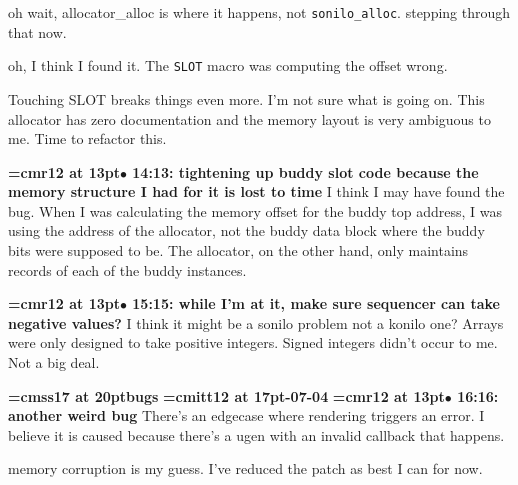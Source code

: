 oh wait, {allocator\_alloc} is where it happens, not {\tt sonilo\_alloc}. stepping through that now.
\par

oh, I think I found it. The {\tt SLOT} macro was computing the offset wrong.
\par

Touching SLOT breaks things even more. I'm not sure what is going on. This allocator has zero documentation and the memory layout is very ambiguous to me. Time to refactor this.
\par

{\smallskip\noindent\bf\font\titlefont=cmr12 at 13pt\titlefont $\bullet$ 14:13: tightening up buddy slot code because the memory structure I had for it is lost to time}\smallskip
I think I may have found the bug. When I was calculating the memory offset for the buddy top address, I was using the address of the allocator, not the buddy data block where the buddy bits were supposed to be. The allocator, on the other hand, only maintains records of each of the buddy instances.
\par

{\smallskip\noindent\bf\font\titlefont=cmr12 at 13pt\titlefont $\bullet$ 15:15: while I'm at it, make sure sequencer can take negative values?}\smallskip
I think it might be a sonilo problem not a konilo one? Arrays were only designed to take positive integers. Signed integers didn't occur to me. Not a big deal.
\par

{\medskip\noindent\bf\font\titlefont=cmss17 at 20pt\titlefont bugs}\medskip
{\medskip\noindent\bf\font\titlefont=cmitt12 at 17pt-07-04}\medskip
{\smallskip\noindent\bf\font\titlefont=cmr12 at 13pt\titlefont $\bullet$ 16:16: another weird bug}\smallskip
There's an edgecase where rendering triggers an error. I believe it is caused because there's a ugen with an invalid callback that happens.
\par

memory corruption is my guess. I've reduced the patch as best I can for now.
\par

